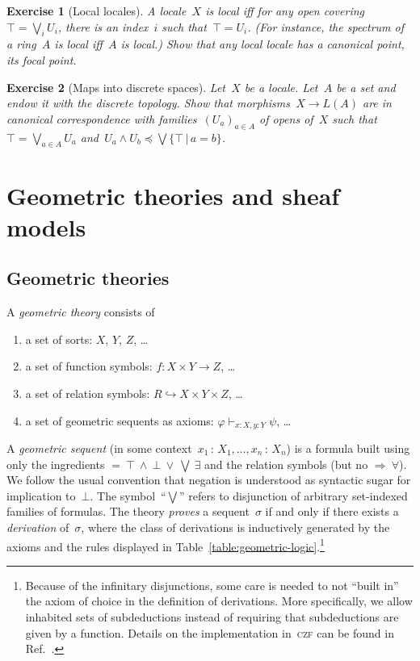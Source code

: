 \documentclass{ws-rv9x6}
\newtheorem{ex}{Exercise}
\newenvironment{exercise}[1]{
  \begin{ex}[#1]
}{\end{ex}}
\renewcommand{\_}{\mathpunct{.}}
\newcommand{\?}{\,{:}\,}
\begin{document}
\begin{exercise}{Local locales}%
\label{ex:local-locales}%
A locale~$X$ is \emph{local} iff for any open covering~$\top = \bigvee_i U_i$,
there is an index~$i$ such that~$\top = U_i$. (For instance, the spectrum of a
ring~$A$ is local iff~$A$ is local.)
Show that any local locale has a canonical point, its \emph{focal point}.
\end{exercise}

\begin{exercise}{Maps into discrete spaces}%
Let~$X$ be a locale. Let~$A$ be a set and endow it with the discrete topology. Show
that morphisms~$X \to L(A)$ are in canonical correspondence with
families~$(U_a)_{a \in A}$ of opens of~$X$ such that~$\top = \bigvee_{a \in A}
U_a$ and~$U_a \wedge U_b \preceq \bigvee\{ \top \,|\, a = b \}$.
\end{exercise}


\section{Geometric theories and sheaf models}

\subsection{Geometric theories}
\label{sect:geometric-theories}

\begin{definition}\label{defn:geometric-theory}
A \emph{geometric theory} consists of
\begin{enumerate}
  \item a set of sorts: $X$, $Y$, $Z$, \ldots
  \item a set of function symbols: $f : X \times Y \to Z$, \ldots
  \item a set of relation symbols: $R \hookrightarrow X \times Y \times Z$, \ldots
  \item a set of geometric sequents as axioms: $\varphi \vdash_{x:X, y:Y} \psi$, \ldots
\end{enumerate}
A \emph{geometric sequent} (in some context~$x_1\?X_1,\ldots,x_n\?X_n$) is a
formula built using only the ingredients ${=}\ {\top}\ {\wedge}\ {\bot}\
{\vee}\ {\bigvee}\ {\exists}$ and the relation symbols (but no ${\Rightarrow}\
{\forall}$). We follow the usual convention that negation is understood as
syntactic sugar for implication to~$\bot$. The symbol~``$\bigvee$'' refers to disjunction of arbitrary
set-indexed families of formulas. The theory \emph{proves} a sequent~$\sigma$ if and
only if there exists a \emph{derivation} of~$\sigma$, where the class of
derivations is inductively generated by the axioms and the rules displayed in
Table~\ref{table:geometric-logic}.\footnote{Because of the infinitary
disjunctions, some care is needed to not ``built in'' the axiom of choice in
the definition of derivations. More specifically, we allow inhabited sets of
subdeductions instead of requiring that subdeductions are given by a function.
Details on the implementation in~\textsc{czf} can be found in
Ref.~\cite[Definition~5.2]{rathjen:barr}.}
\end{definition}
\end{document}
